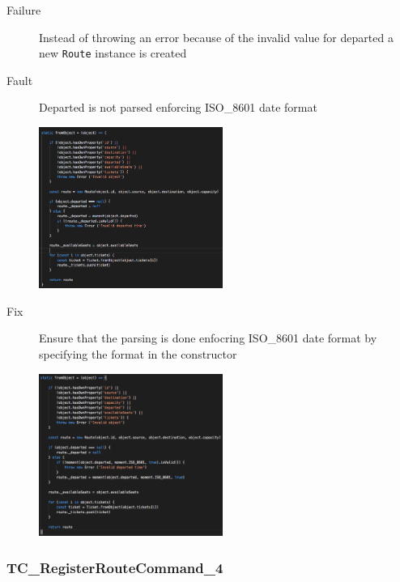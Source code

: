 \documentclass[11pt]{article}
\begin{document}
\begin{description}
\item[{Failure}] Instead of throwing an error because of the invalid value for departed a new \texttt{Route} instance is created
\item[{Fault}] Departed is not parsed enforcing ISO\_8601 date format
\begin{center}
\includegraphics[width=6cm]{./Iteration2.rtfd/Pasted Graphic 8.tiff.png}
\end{center}
\item[{Fix}] Ensure that the parsing is done enfocring ISO\_8601 date format by specifying the format in the constructor
\begin{center}
\includegraphics[width=6cm]{./Iteration2.rtfd/Pasted Graphic 7.tiff.png}
\end{center}
\end{description}

\subsubsection{TC\_RegisterRouteCommand\_4}
\label{sec:orge63fa08}
\end{document}
